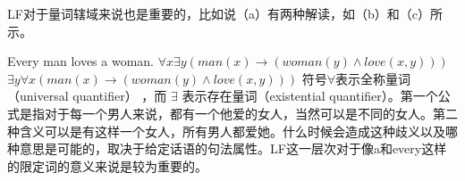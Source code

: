 LF对于量词辖域来说也是重要的，比如说（a）有两种解读，如（b）和（c）所示。

\eal
\label{Beispiel-Every-man-loves-a-woman}
\ex Every man loves a woman.
\ex $\forall x \exists y (man(x) \to (woman(y) \wedge love(x,y)))$
\ex $\exists y \forall x (man(x) \to (woman(y) \wedge love(x,y)))$
\zl
符号$\forall$\is{$\forall$}表示全称量词（universal quantifier） ，而 $\exists$\is{$\exists$} 表示存在量词（existential quantifier）。第一个公式是指对于每一个男人来说，都有一个他爱的女人，当然可以是不同的女人。第二种含义可以是有这样一个女人，所有男人都爱她。什么时候会造成这种歧义以及哪种意思是可能的，取决于给定话语的句法属性。LF这一层次对于像a和every这样的限定词的意义来说是较为重要的。

